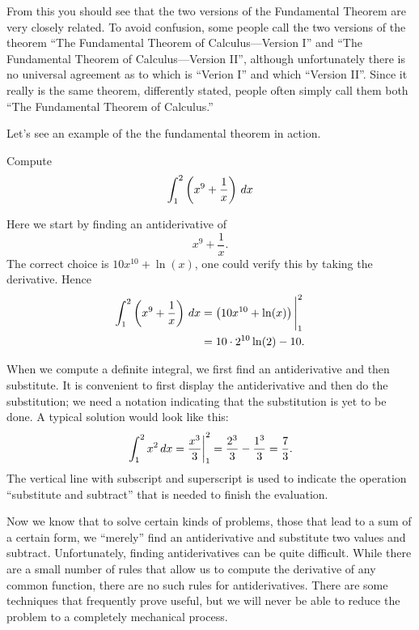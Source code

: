 From this you should see that the two versions of the Fundamental
Theorem are very closely related. To avoid confusion, some people call
the two versions of the theorem ``The Fundamental Theorem of
Calculus---Version I'' and ``The Fundamental Theorem of
Calculus---Version II'', although unfortunately there is no universal
agreement as to which is ``Verion I'' and which ``Version II''. Since
it really is the same theorem, differently stated, people often simply
call them both ``The Fundamental Theorem of Calculus.''

Let's see an example of the the fundamental theorem in action.

\begin{example}
Compute
\[
\int_1^2\left(x^9 + \frac{1}{x}\right) \, d x
\]
\end{example}

\begin{solution}
Here we start by finding an antiderivative of 
\[
x^9 + \frac{1}{x}.
\]
The correct choice is $10x^{10} + \ln(x)$, one could verify this by
taking the derivative. Hence
\begin{align*}
\int_1^2\left(x^9 + \frac{1}{x}\right) \, d x &= \left(10x^{10} + \ln(x)\right)\Bigg|_1^2 \\
&= 10\cdot 2^{10} \ln(2) - 10.
\end{align*}
\end{solution}


When we compute a definite integral, we first find an antiderivative
and then substitute. It is convenient to first display the
antiderivative and then do the substitution; we need a notation
indicating that the substitution is yet to be done. A typical solution
would look like this:
\[
  \left.\int_1^2 x^2\, d x={x^3\over 3}\right|_1^2 = 
  {2^3\over3}-{1^3\over3}={7\over3}.
\]
The vertical line with subscript and superscript is used to indicate
the operation ``substitute and subtract'' that is needed to finish the
evaluation. 

Now we know that to solve certain kinds of problems, those that lead
to a sum of a certain form, we ``merely'' find an antiderivative and
substitute two values and subtract. Unfortunately, finding
antiderivatives can be quite difficult. While there are a small number
of rules that allow us to compute the derivative of any common
function, there are no such rules for antiderivatives. There are some
techniques that frequently prove useful, but we will never be able to
reduce the problem to a completely mechanical process.






